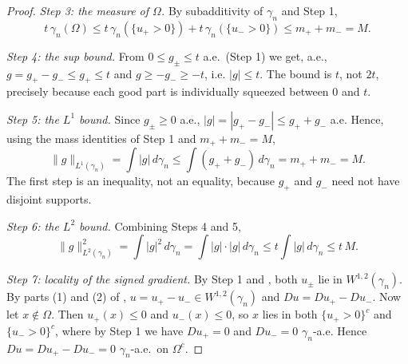 \begin{proof}
\emph{Step 3: the measure of $\Omega$.}
By subadditivity of $\gamma_n$ and Step 1,
\[
  t\,\gamma_n(\Omega)
    \leq t\,\gamma_n(\{u_+>0\}) + t\,\gamma_n(\{u_->0\})
    \leq m_+ + m_- = M .
\]

\emph{Step 4: the sup bound.}
From $0 \leq g_\pm \leq t$ a.e.\ (Step 1) we get, a.e.,
$g = g_+ - g_- \leq g_+ \leq t$ and $g \geq -g_- \geq -t$, i.e.
$|g| \leq t$.  The bound is $t$, not $2t$, precisely because each good part is
individually squeezed between $0$ and $t$.

\emph{Step 5: the $L^1$ bound.}
Since $g_\pm \geq 0$ a.e., $|g| = |g_+ - g_-| \leq g_+ + g_-$ a.e.  Hence, using
the mass identities of Step 1 and $m_++m_-=M$,
\[
  \|g\|_{L^1(\gamma_n)} = \int |g| \, d\gamma_n
    \leq \int (g_+ + g_-)\, d\gamma_n = m_+ + m_- = M .
\]
The first step is an inequality, not an equality, because $g_+$ and $g_-$ need not
have disjoint supports.

\emph{Step 6: the $L^2$ bound.}
Combining Steps 4 and 5,
\[
  \|g\|_{L^2(\gamma_n)}^2 = \int |g|^2\, d\gamma_n
    = \int |g|\cdot|g|\, d\gamma_n
    \leq t \int |g|\, d\gamma_n \leq t\,M .
\]

\emph{Step 7: locality of the signed gradient.}
By Step 1 and , both $u_\pm$ lie in
$W^{1,2}(\gamma_n)$.  By parts (1) and (2) of ,
$u = u_+ - u_- \in W^{1,2}(\gamma_n)$ and $Du = Du_+ - Du_-$.  Now let
$x \notin \Omega$.  Then $u_+(x) \leq 0$ and $u_-(x) \leq 0$, so $x$ lies in both
$\{u_+>0\}^c$ and $\{u_->0\}^c$, where by Step 1 we have $Du_+ = 0$ and
$Du_- = 0$ $\gamma_n$-a.e.  Hence $Du = Du_+ - Du_- = 0$ $\gamma_n$-a.e.\ on
$\Omega^c$.
\end{proof}
